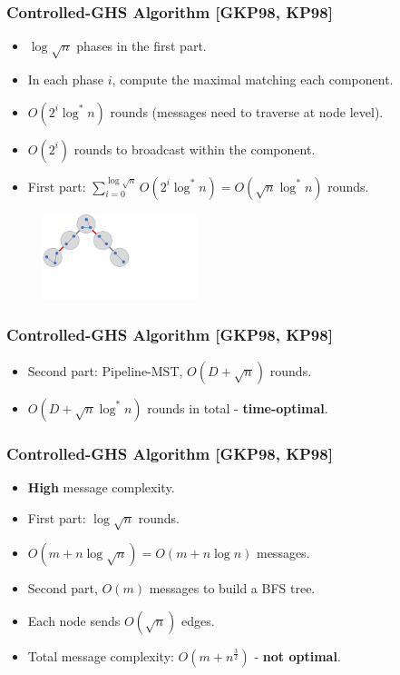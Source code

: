 \begin{frame}
\frametitle{Controlled-GHS Algorithm [GKP98, KP98]}
\begin{itemize}
\item $\log \sqrt{n}$ phases in the first part.
\item In each phase $i$, compute the maximal matching each component.
\item $O(2^i \log^*n)$ rounds (messages need to traverse at node level).
\item $O(2^i)$ rounds to broadcast within the component.
\item First part: $\sum_{i=0}^{\log \sqrt{n}} O(2^i \log^* n) = O(\sqrt{n}\log^*n)$ rounds.
\end{itemize}
\begin{figure}
\centering
\includegraphics[width=0.4\textwidth,trim={0cm 5cm 12cm 0},clip]{figures/comptree.pdf}
\end{figure}
\end{frame}

\begin{frame}
\frametitle{Controlled-GHS Algorithm [GKP98, KP98]}
\begin{itemize}
\item Second part: Pipeline-MST, $O(D + \sqrt{n})$ rounds.
\item $O(D + \sqrt{n}\log^* n)$ rounds in total - \textbf{time-optimal}.
\end{itemize}
\end{frame}

\begin{frame}
\frametitle{Controlled-GHS Algorithm [GKP98, KP98]}
\begin{itemize}
\item \textbf{High} message complexity.
\item First part: $\log \sqrt n$ rounds. 
\item $O(m + n \log \sqrt{n}) = O(m + n\log n)$ messages.
\item Second part, $O(m)$ messages to build a BFS tree.
\item Each node sends $O(\sqrt{n})$ edges. 
\item Total message complexity: $O(m+n^{\frac{3}{2}})$ - \textbf{not optimal}.
\end{itemize}
\end{frame}